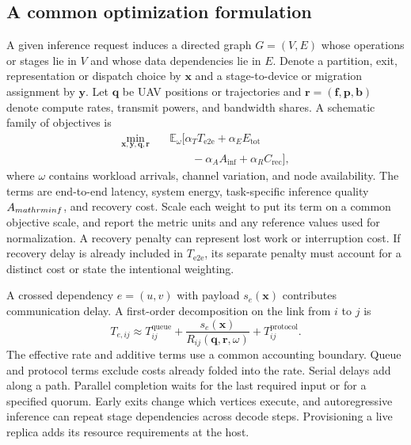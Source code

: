 \documentclass[journal]{IEEEtran}
\begin{document}
\subsection{A common optimization formulation}
A given inference request induces a directed graph $G=(V,E)$ whose operations or stages lie in $V$ and whose data dependencies lie in $E$. Denote a partition, exit, representation or dispatch choice by $\mathbf{x}$ and a stage-to-device or migration assignment by $\mathbf{y}$. Let $\mathbf{q}$ be UAV positions or trajectories and $\mathbf{r}=(\mathbf{f},\mathbf{p},\mathbf{b})$ denote compute rates, transmit powers, and bandwidth shares. A schematic family of objectives is
\begin{equation}
\begin{aligned}
\min_{\mathbf{x},\mathbf{y},\mathbf{q},\mathbf{r}}\quad
 &\mathbb{E}_{\omega}\bigl[\alpha_T T_{\mathrm{e2e}} + \alpha_E E_{\mathrm{tot}} \\
 &\qquad - \alpha_A A_{\mathrm{inf}} + \alpha_R C_{\mathrm{rec}}\bigr],
\end{aligned}\label{eq:objective}
\end{equation}
where $\omega$ contains workload arrivals, channel variation, and node availability. The terms are end-to-end latency, system energy, task-specific inference quality $A_{\\mathrm{inf}}$, and recovery cost. Scale each weight to put its term on a common objective scale, and report the metric units and any reference values used for normalization. A recovery penalty can represent lost work or interruption cost. If recovery delay is already included in $T_{\mathrm{e2e}}$, its separate penalty must account for a distinct cost or state the intentional weighting.

A crossed dependency $e=(u,v)$ with payload $s_e(\mathbf{x})$ contributes communication delay. A first-order decomposition on the link from $i$ to $j$ is
\begin{equation}
 T_{e,ij}\approx T^{\mathrm{queue}}_{ij}
     +\frac{s_e(\mathbf{x})}{R_{ij}(\mathbf{q},\mathbf{r},\omega)}
     +T^{\mathrm{protocol}}_{ij}.
\label{eq:link}
\end{equation}
The effective rate and additive terms use a common accounting boundary. Queue and protocol terms exclude costs already folded into the rate. Serial delays add along a path. Parallel completion waits for the last required input or for a specified quorum. Early exits change which vertices execute, and autoregressive inference can repeat stage dependencies across decode steps. Provisioning a live replica adds its resource requirements at the host.
\end{document}
